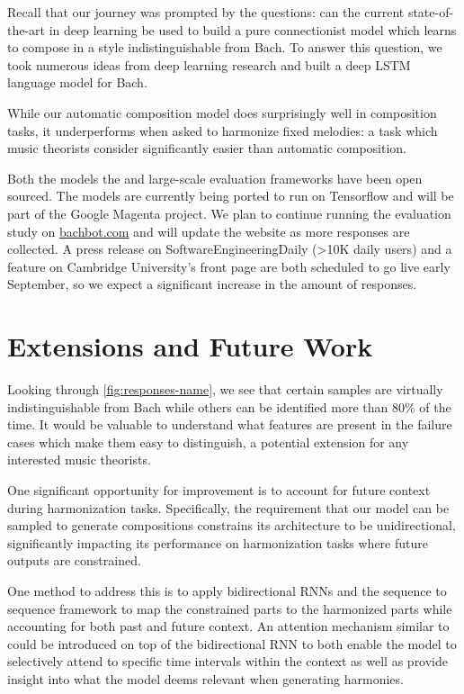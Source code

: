 Recall that our journey was prompted by the questions: can the current
state-of-the-art in deep learning be used to build a pure connectionist
model which learns to compose in a style indistinguishable from Bach. To
answer this question, we took numerous ideas from deep learning research
and built a deep LSTM language model for Bach.

While our automatic composition model does surprisingly well in composition
tasks, it underperforms when asked to harmonize fixed melodies: a task which
music theorists consider significantly easier than automatic composition.

Both the models the and large-scale evaluation frameworks have been open
sourced. The models are currently being ported to run on Tensorflow and will be
part of the Google Magenta project. We plan to continue running the evaluation
study on \url{bachbot.com} and will update the website as more responses are
collected. A press release on SoftwareEngineeringDaily (>10K daily users) and a
feature on Cambridge University's front page are both scheduled to go live
early September, so we expect a significant increase in the amount of
responses.

\section{Extensions and Future Work}\label{sec:future-work}

Looking through \vref{fig:responses-name}, we see that certain
samples are virtually indistinguishable from Bach while others
can be identified more than $80\%$ of the time. It would be valuable
to understand what features are present in the failure cases which
make them easy to distinguish, a potential extension for any
interested music theorists.

One significant opportunity for improvement is to account for future
context during harmonization tasks. Specifically, the requirement that
our model can be sampled to generate compositions constrains its
architecture to be unidirectional, significantly impacting its
performance on harmonization tasks where future outputs are constrained.

One method to address this is to apply bidirectional
RNNs\citep{Graves2005} and the sequence to sequence
framework\citep{sutskever2014sequence} to map the constrained parts to
the harmonized parts while accounting for both past and future context.
An attention mechanism similar to \citet{Bahdanau2015} could be
introduced on top of the bidirectional RNN to both enable the model to
selectively attend to specific time intervals within the context as well
as provide insight into what the model deems relevant when generating
harmonies.

